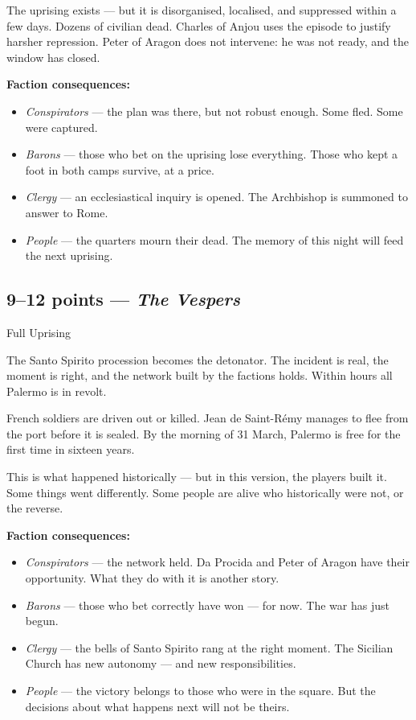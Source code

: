 The uprising exists --- but it is disorganised, localised, and suppressed
within a few days. Dozens of civilian dead. Charles of Anjou uses the
episode to justify harsher repression. Peter of Aragon does not intervene:
he was not ready, and the window has closed.

\textbf{Faction consequences:}
\begin{itemize}[nosep]
  \item \textit{Conspirators} --- the plan was there, but not robust
    enough. Some fled. Some were captured.
  \item \textit{Barons} --- those who bet on the uprising lose everything.
    Those who kept a foot in both camps survive, at a price.
  \item \textit{Clergy} --- an ecclesiastical inquiry is opened.
    The Archbishop is summoned to answer to Rome.
  \item \textit{People} --- the quarters mourn their dead. The memory
    of this night will feed the next uprising.
\end{itemize}

\secsep

\subsection{9--12 points --- \textit{The Vespers}}
\textcolor{oro}{\cinzel\large Full Uprising}

\filetto

The Santo Spirito procession becomes the detonator. The incident is
real, the moment is right, and the network built by the factions holds.
Within hours all Palermo is in revolt.

French soldiers are driven out or killed. Jean de Saint-Rémy manages
to flee from the port before it is sealed. By the morning of 31 March,
Palermo is free for the first time in sixteen years.

This is what happened historically --- but in this version, the players
built it. Some things went differently. Some people are alive who
historically were not, or the reverse.

\textbf{Faction consequences:}
\begin{itemize}[nosep]
  \item \textit{Conspirators} --- the network held. Da Procida and
    Peter of Aragon have their opportunity. What they do with it is
    another story.
  \item \textit{Barons} --- those who bet correctly have won --- for now.
    The war has just begun.
  \item \textit{Clergy} --- the bells of Santo Spirito rang at the
    right moment. The Sicilian Church has new autonomy --- and new
    responsibilities.
  \item \textit{People} --- the victory belongs to those who were in
    the square. But the decisions about what happens next will not be
    theirs.
\end{itemize}

